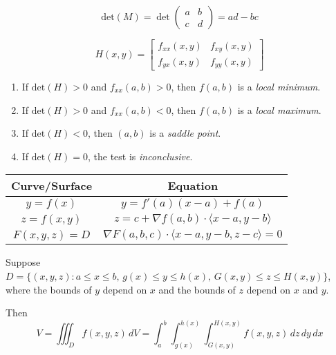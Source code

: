 \documentclass{report}
\begin{document}
\pagebreak
\begin{center}
	
\[
		\text{det}(M) = \det\begin{pmatrix} a & b \\ c & d \end{pmatrix} = ad - bc
\]

\[
	H(x, y) = \begin{bmatrix}
		f_{xx}(x, y) & f_{xy}(x, y) \\
		f_{yx}(x, y) & f_{yy}(x, y)
	\end{bmatrix}
\]


	\begin{enumerate}
		\item If \( \text{det}(H) > 0 \) and \( f_{xx}(a, b) > 0 \), then \( f(a, b) \) is a \emph{local minimum}.
		\item If \( \text{det}(H) > 0 \) and \( f_{xx}(a, b) < 0 \), then \( f(a, b) \) is a \emph{local maximum}.
		\item If \( \text{det}(H) < 0 \), then \( (a, b) \) is a \emph{saddle point}.
		\item If \( \text{det}(H) = 0 \), the test is \emph{inconclusive}.
	\end{enumerate}
\end{center}

\begin{center}
	\begin{tabular}{|c|c|}
		\hline
		\textbf{Curve/Surface} & \textbf{Equation}                                                     \\
		\hline
		\( y = f(x) \)         & \( y = f'(a)(x - a) + f(a) \)                                         \\
		\( z = f(x, y) \)      & \( z = c + \nabla f(a, b) \cdot \langle x - a, y - b \rangle \)       \\
		\( F(x, y, z) = D \)   & \( \nabla F(a, b, c) \cdot \langle x - a, y - b, z - c \rangle = 0 \) \\
		\hline
	\end{tabular}
\end{center}

Suppose \( D = \{ (x,y,z) : a \leq x \leq b, \, g(x) \leq y \leq h(x), \, G(x,y) \leq z \leq H(x,y) \} \),
	where the bounds of \( y \) depend on \( x \) and the bounds of \( z \) depend on \( x \) and \( y \).

	Then
	\[
		V = \iiint_D f(x,y,z) \, dV = \int_a^b \int_{g(x)}^{h(x)} \int_{G(x,y)}^{H(x,y)} f(x,y,z) \, dz \, dy \, dx
	\]
\end{document}
